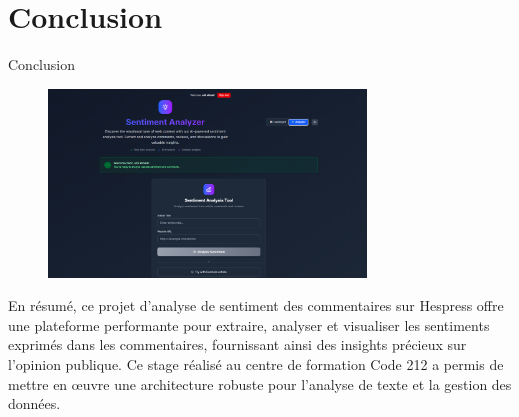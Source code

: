 \section{Conclusion}

\begin{frame}{Conclusion}
    \begin{figure}[H]
        \centering
        \includegraphics[height=5cm]{assets/images/conclusion-ui.png}
    \end{figure}
    En résumé, ce projet d'analyse de sentiment des commentaires sur Hespress offre une plateforme performante pour extraire, analyser et visualiser les sentiments exprimés dans les commentaires, fournissant ainsi des insights précieux sur l'opinion publique. Ce stage réalisé au centre de formation Code 212 a permis de mettre en œuvre une architecture robuste pour l'analyse de texte et la gestion des données.
\end{frame}


